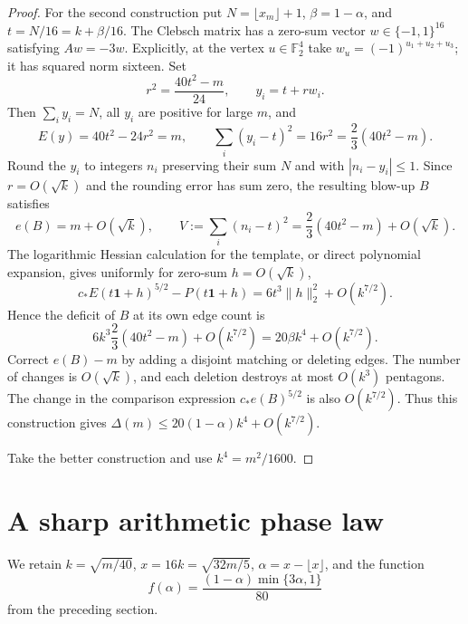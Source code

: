 \documentclass[11pt]{amsart}
\theoremstyle{definition}
\theoremstyle{remark}
\begin{document}
\begin{proof}
For the second construction put $N=\lfloor x_m\rfloor+1$,
$\beta=1-\alpha$, and $t=N/16=k+\beta/16$. The Clebsch matrix has a
zero-sum vector $w\in\{-1,1\}^{16}$ satisfying $Aw=-3w$. Explicitly, at
the vertex $u\in\mathbb F_2^4$ take $w_u=(-1)^{u_1+u_2+u_3}$; it has
squared norm sixteen. Set
\[
 r^2=\frac{40t^2-m}{24},\qquad y_i=t+rw_i.
\]
Then $\sum_i y_i=N$, all $y_i$ are positive for large $m$, and
\[
 E(y)=40t^2-24r^2=m,\qquad
 \sum_i(y_i-t)^2=16r^2=\frac23(40t^2-m).
\]
Round the $y_i$ to integers $n_i$ preserving their sum $N$ and with
$|n_i-y_i|\leq1$. Since $r=O(\sqrt{k})$ and the rounding error has sum
zero, the resulting blow-up $B$ satisfies
\[
 e(B)=m+O(\sqrt{k}),\qquad
 V:=\sum_i(n_i-t)^2=\frac23(40t^2-m)+O(\sqrt{k}).
\]
The logarithmic Hessian calculation for the template, or direct
polynomial expansion, gives uniformly for zero-sum $h=O(\sqrt{k})$,
\[
 c_\ast E(t\mathbf1+h)^{5/2}-P(t\mathbf1+h)
   =6t^3\lVert h\rVert_2^2+O(k^{7/2}).
\]
Hence the deficit of $B$ at its own edge count is
\[
 6k^3\frac23(40t^2-m)+O(k^{7/2})
   =20\beta k^4+O(k^{7/2}).
\]
Correct $e(B)-m$ by adding a disjoint matching or deleting edges. The
number of changes is $O(\sqrt{k})$, and each deletion destroys at most
$O(k^3)$ pentagons. The change in the comparison expression
$c_\ast e(B)^{5/2}$ is also $O(k^{7/2})$. Thus this construction gives
$\Delta(m)\leq20(1-\alpha)k^4+O(k^{7/2})$.

Take the better construction and use $k^4=m^2/1600$.
\end{proof}

\section{A sharp arithmetic phase law}\label{sec:phase-law}

We retain $k=\sqrt{m/40}$, $x=16k=\sqrt{32m/5}$,
$\alpha=x-\lfloor x\rfloor$, and the function
\[
 f(\alpha)=\frac{(1-\alpha)\min\{3\alpha,1\}}{80}
\]
from the preceding section.
\end{document}
